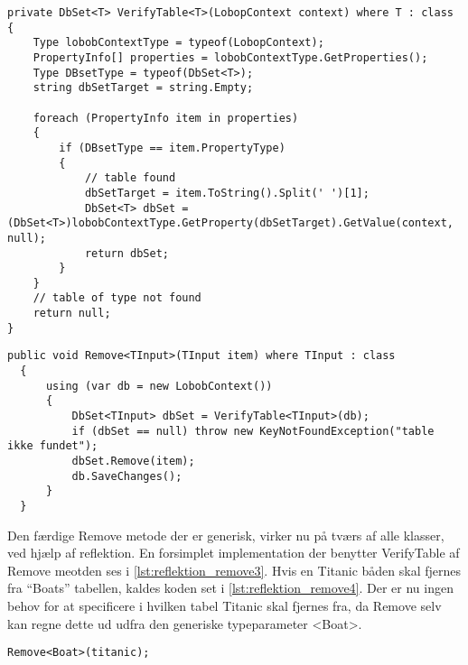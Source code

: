\begin{lstlisting}[label=lst:reflektion_verifytable, caption={Metode der tjekker om en tabel af typen T findes i databasen.}]
private DbSet<T> VerifyTable<T>(LobopContext context) where T : class
{
    Type lobobContextType = typeof(LobopContext);
    PropertyInfo[] properties = lobobContextType.GetProperties();
    Type DBsetType = typeof(DbSet<T>);
    string dbSetTarget = string.Empty;

    foreach (PropertyInfo item in properties)
    {
        if (DBsetType == item.PropertyType)
        {
            // table found
            dbSetTarget = item.ToString().Split(' ')[1];
            DbSet<T> dbSet = (DbSet<T>)lobobContextType.GetProperty(dbSetTarget).GetValue(context, null);
            return dbSet;
        }
    }
    // table of type not found
    return null;
}
\end{lstlisting}

\begin{lstlisting}[label=lst:reflektion_remove3, caption={Remove metode der kan tage en vilkårlig klasse ind, finde den rette tabel og derefter slette det parametiserede objekt}]
  public void Remove<TInput>(TInput item) where TInput : class
  {
      using (var db = new LobobContext())
      {
          DbSet<TInput> dbSet = VerifyTable<TInput>(db);
          if (dbSet == null) throw new KeyNotFoundException("table ikke fundet");
          dbSet.Remove(item);
          db.SaveChanges();
      }
  } 
\end{lstlisting}

Den færdige Remove metode der er generisk, virker nu på tværs af alle klasser, ved hjælp af reflektion. En forsimplet implementation der benytter VerifyTable af Remove meotden ses i \cref{lst:reflektion_remove3}. Hvis en Titanic båden skal fjernes fra \enquote{Boats} tabellen, kaldes koden set i \cref{lst:reflektion_remove4}. Der er nu ingen behov for at specificere i hvilken tabel Titanic skal fjernes fra, da Remove selv kan regne dette ud udfra den generiske typeparameter <Boat>.

\begin{lstlisting}[label=lst:reflektion_remove4]
Remove<Boat>(titanic);
\end{lstlisting}
